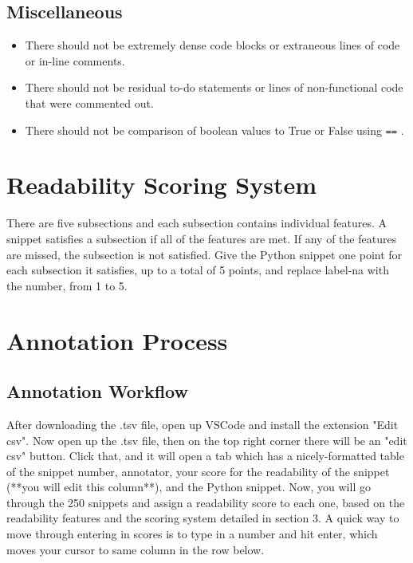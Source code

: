\documentclass[11pt]{article}
\begin{document}
\subsection{Miscellaneous}

\begin{itemize}

    \item There should not be extremely dense code blocks or extraneous lines of code or in-line comments.

    \item There should not be residual to-do statements or lines of non-functional code that were commented out.
    
    \item There should not be comparison of boolean values to True or False using \texttt{==} \cite{pep8_recommendations}.

\end{itemize}

\newpage

\section{Readability Scoring System}

There are five subsections and each subsection contains individual features. A snippet satisfies a subsection if all of the features are met. If any of the features are missed, the subsection is not satisfied. Give the Python snippet one point for each subsection it satisfies, up to a total of 5 points, and replace label-na with the number, from 1 to 5.

\section{Annotation Process}

\subsection{Annotation Workflow}

After downloading the .tsv file, open up VSCode and install the extension "Edit csv". Now open up the .tsv file, then on the top right corner there will be an "edit csv" button. Click that, and it will open a tab which has a nicely-formatted table of the snippet number, annotator, your score for the readability of the snippet (**you will edit this column**), and the Python snippet. Now, you will go through the 250 snippets and assign a readability score to each one, based on the readability features and the scoring system detailed in section 3. A quick way to move through entering in scores is to type in a number and hit enter, which moves your cursor to same column in the row below.
\end{document}
